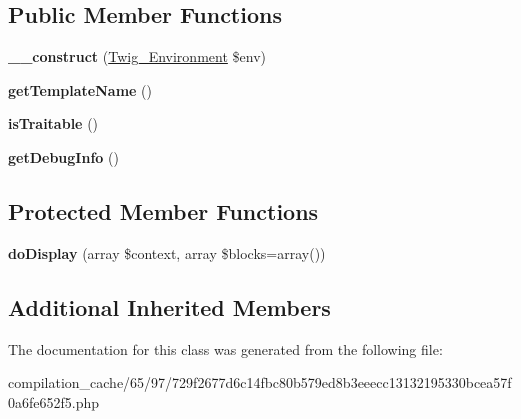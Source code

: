 \subsection*{Public Member Functions}
\begin{DoxyCompactItemize}
\item 
\hypertarget{class_____twig_template__6597729f2677d6c14fbc80b579ed8b3eeecc13132195330bcea57f0a6fe652f5_a4f8326243132c1450a81e0a817aa1be7}{}{\bfseries \+\_\+\+\_\+construct} (\hyperlink{class_twig___environment}{Twig\+\_\+\+Environment} \$env)\label{class_____twig_template__6597729f2677d6c14fbc80b579ed8b3eeecc13132195330bcea57f0a6fe652f5_a4f8326243132c1450a81e0a817aa1be7}

\item 
\hypertarget{class_____twig_template__6597729f2677d6c14fbc80b579ed8b3eeecc13132195330bcea57f0a6fe652f5_a621a3ccd148ed8b9e937da6959c98f39}{}{\bfseries get\+Template\+Name} ()\label{class_____twig_template__6597729f2677d6c14fbc80b579ed8b3eeecc13132195330bcea57f0a6fe652f5_a621a3ccd148ed8b9e937da6959c98f39}

\item 
\hypertarget{class_____twig_template__6597729f2677d6c14fbc80b579ed8b3eeecc13132195330bcea57f0a6fe652f5_aa9eb89be270f6afc256ef5e272b78a63}{}{\bfseries is\+Traitable} ()\label{class_____twig_template__6597729f2677d6c14fbc80b579ed8b3eeecc13132195330bcea57f0a6fe652f5_aa9eb89be270f6afc256ef5e272b78a63}

\item 
\hypertarget{class_____twig_template__6597729f2677d6c14fbc80b579ed8b3eeecc13132195330bcea57f0a6fe652f5_abd0ecb0136f4228db2bd963bfc1e20d7}{}{\bfseries get\+Debug\+Info} ()\label{class_____twig_template__6597729f2677d6c14fbc80b579ed8b3eeecc13132195330bcea57f0a6fe652f5_abd0ecb0136f4228db2bd963bfc1e20d7}

\end{DoxyCompactItemize}
\subsection*{Protected Member Functions}
\begin{DoxyCompactItemize}
\item 
\hypertarget{class_____twig_template__6597729f2677d6c14fbc80b579ed8b3eeecc13132195330bcea57f0a6fe652f5_adb62b7c226e07d30f836ed16158d924f}{}{\bfseries do\+Display} (array \$context, array \$blocks=array())\label{class_____twig_template__6597729f2677d6c14fbc80b579ed8b3eeecc13132195330bcea57f0a6fe652f5_adb62b7c226e07d30f836ed16158d924f}

\end{DoxyCompactItemize}
\subsection*{Additional Inherited Members}


The documentation for this class was generated from the following file\+:\begin{DoxyCompactItemize}
\item 
compilation\+\_\+cache/65/97/729f2677d6c14fbc80b579ed8b3eeecc13132195330bcea57f0a6fe652f5.\+php\end{DoxyCompactItemize}
